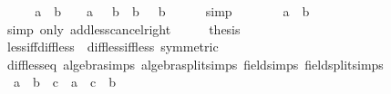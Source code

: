 \begin{isabellebody}
%
\isadelimproof
%
\endisadelimproof
%
\isatagproof
{}\isamarkupfalse%
\ {\isacharminus}{\kern0pt}\isanewline
\ \ \isamarkupfalse%
\ {\isachardoublequoteopen}a\ {\isacharminus}{\kern0pt}\ b\ {\isacharless}{\kern0pt}\ {}\ {\isasymlongleftrightarrow}\ a\ {\isacharplus}{\kern0pt}\ {\isacharparenleft}{\kern0pt}{\isacharminus}{\kern0pt}\ b{\isacharparenright}{\kern0pt}\ {\isacharless}{\kern0pt}\ b\ {\isacharplus}{\kern0pt}\ {\isacharparenleft}{\kern0pt}{\isacharminus}{\kern0pt}\ b{\isacharparenright}{\kern0pt}{\isachardoublequoteclose}\isanewline
\ \ \ \ \isamarkupfalse%
\ simp\isanewline
\ \ \isamarkupfalse%
\ \isamarkupfalse%
\ {\isachardoublequoteopen}{\isasymdots}\ {\isasymlongleftrightarrow}\ a\ {\isacharless}{\kern0pt}\ b{\isachardoublequoteclose}\isanewline
\ \ \ \ \isamarkupfalse%
\ {\isacharparenleft}{\kern0pt}simp\ only{\isacharcolon}{\kern0pt}\ add{\isacharunderscore}{\kern0pt}less{\isacharunderscore}{\kern0pt}cancel{\isacharunderscore}{\kern0pt}right{\isacharparenright}{\kern0pt}\isanewline
\ \ \isamarkupfalse%
\ \isamarkupfalse%
\ {\isacharquery}{\kern0pt}thesis\ \isacommand{{\isachardot}{\kern0pt}}\isamarkupfalse%
\isanewline
{}\isamarkupfalse%
%
\endisatagproof
{\isafoldproof}%
%
\isadelimproof
\isanewline
%
\endisadelimproof
\isanewline
{}\isamarkupfalse%
\ less{\isacharunderscore}{\kern0pt}iff{\isacharunderscore}{\kern0pt}diff{\isacharunderscore}{\kern0pt}less{\isacharunderscore}{\kern0pt}{}\ {\isacharequal}{\kern0pt}\ diff{\isacharunderscore}{\kern0pt}less{\isacharunderscore}{\kern0pt}{}{\isacharunderscore}{\kern0pt}iff{\isacharunderscore}{\kern0pt}less\ {\isacharbrackleft}{\kern0pt}symmetric{\isacharbrackright}{\kern0pt}\isanewline
\isanewline
{}\isamarkupfalse%
\ diff{\isacharunderscore}{\kern0pt}less{\isacharunderscore}{\kern0pt}eq\ {\isacharbrackleft}{\kern0pt}algebra{\isacharunderscore}{\kern0pt}simps{\isacharcomma}{\kern0pt}\ algebra{\isacharunderscore}{\kern0pt}split{\isacharunderscore}{\kern0pt}simps{\isacharcomma}{\kern0pt}\ field{\isacharunderscore}{\kern0pt}simps{\isacharcomma}{\kern0pt}\ field{\isacharunderscore}{\kern0pt}split{\isacharunderscore}{\kern0pt}simps{\isacharbrackright}{\kern0pt}{\isacharcolon}{\kern0pt}\isanewline
\ \ {\isachardoublequoteopen}a\ {\isacharminus}{\kern0pt}\ b\ {\isacharless}{\kern0pt}\ c\ {\isasymlongleftrightarrow}\ a\ {\isacharless}{\kern0pt}\ c\ {\isacharplus}{\kern0pt}\ b{\isachardoublequoteclose}\isanewline

\end{isabellebody}
